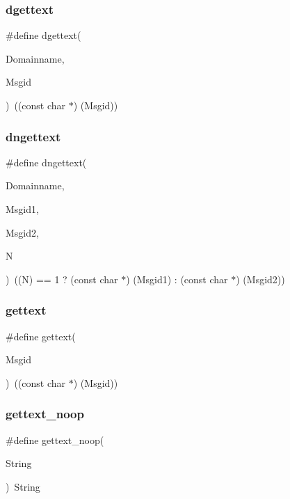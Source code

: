 \subsubsection{dgettext}
{\footnotesize\ttfamily \#define dgettext(\begin{DoxyParamCaption}\item[{}]{Domainname,  }\item[{}]{Msgid }\end{DoxyParamCaption})~((const char $\ast$) (Msgid))}

\mbox{\label{gettext_8h_a06fa46950f520d32c10de24270198932}} 
\subsubsection{dngettext}
{\footnotesize\ttfamily \#define dngettext(\begin{DoxyParamCaption}\item[{}]{Domainname,  }\item[{}]{Msgid1,  }\item[{}]{Msgid2,  }\item[{}]{N }\end{DoxyParamCaption})~((N) == 1 ? (const char $\ast$) (Msgid1) \+: (const char $\ast$) (Msgid2))}

\mbox{\label{gettext_8h_aa0fab2ce0e5eb897c393cee0d83c6ea9}} 
\subsubsection{gettext}
{\footnotesize\ttfamily \#define gettext(\begin{DoxyParamCaption}\item[{}]{Msgid }\end{DoxyParamCaption})~((const char $\ast$) (Msgid))}

\mbox{\label{gettext_8h_a1a0ef2e42374f90a13299cc06f437847}} 
\subsubsection{gettext\+\_\+noop}
{\footnotesize\ttfamily \#define gettext\+\_\+noop(\begin{DoxyParamCaption}\item[{}]{String }\end{DoxyParamCaption})~String}


